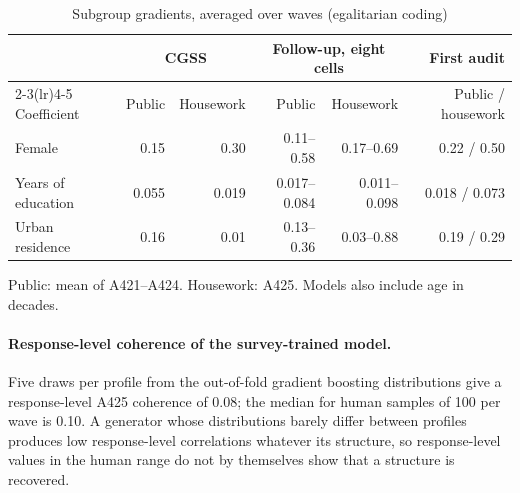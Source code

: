 \documentclass[11pt]{article}
\begin{document}
\begin{table}[H]
\centering
\caption{Subgroup gradients, averaged over waves (egalitarian coding)}
\label{tab:gradients}
\small
\begin{tabular}{lrrrrr}
\toprule
 & \multicolumn{2}{c}{CGSS} & \multicolumn{2}{c}{Follow-up, eight cells} & First audit \\
\cmidrule(lr){2-3}\cmidrule(lr){4-5}
Coefficient & Public & Housework & Public & Housework & Public / housework \\
\midrule
Female & 0.15 & 0.30 & 0.11--0.58 & 0.17--0.69 & 0.22 / 0.50 \\
Years of education & 0.055 & 0.019 & 0.017--0.084 & 0.011--0.098 & 0.018 / 0.073 \\
Urban residence & 0.16 & 0.01 & 0.13--0.36 & 0.03--0.88 & 0.19 / 0.29 \\
\bottomrule
\end{tabular}
\begin{tablenotes}\footnotesize
\item Public: mean of A421--A424. Housework: A425. Models also include age in decades.
\end{tablenotes}
\end{table}

\paragraph{Response-level coherence of the survey-trained model.} Five draws per profile from the out-of-fold gradient boosting distributions give a response-level A425 coherence of 0.08; the median for human samples of 100 per wave is 0.10. A generator whose distributions barely differ between profiles produces low response-level correlations whatever its structure, so response-level values in the human range do not by themselves show that a structure is recovered.
\end{document}
